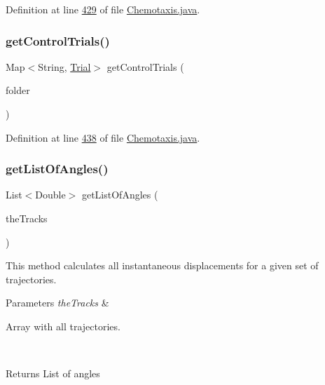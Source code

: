 Definition at line \hyperlink{_chemotaxis_8java_source_l00429}{429} of file \hyperlink{_chemotaxis_8java_source}{Chemotaxis.\+java}.

\hypertarget{classanalysis_1_1_chemotaxis_a00ea60f92f2e11a363c01d04b6df7f10}{}\label{classanalysis_1_1_chemotaxis_a00ea60f92f2e11a363c01d04b6df7f10} 
\subsubsection{\texorpdfstring{get\+Control\+Trials()}{getControlTrials()}}
{\footnotesize\ttfamily Map$<$String, \hyperlink{classdata_1_1_trial}{Trial}$>$ get\+Control\+Trials (\begin{DoxyParamCaption}\item[{String}]{folder }\end{DoxyParamCaption})\hspace{0.3cm}{\ttfamily [private]}}



Definition at line \hyperlink{_chemotaxis_8java_source_l00438}{438} of file \hyperlink{_chemotaxis_8java_source}{Chemotaxis.\+java}.

\hypertarget{classanalysis_1_1_chemotaxis_a0a5886ad5b1d3a1dee18ed4fe5da7ed8}{}\label{classanalysis_1_1_chemotaxis_a0a5886ad5b1d3a1dee18ed4fe5da7ed8} 
\subsubsection{\texorpdfstring{get\+List\+Of\+Angles()}{getListOfAngles()}}
{\footnotesize\ttfamily List$<$Double$>$ get\+List\+Of\+Angles (\begin{DoxyParamCaption}\item[{\hyperlink{classdata_1_1_serializable_list}{Serializable\+List}}]{the\+Tracks }\end{DoxyParamCaption})\hspace{0.3cm}{\ttfamily [private]}}

This method calculates all instantaneous displacements for a given set of trajectories.


\begin{DoxyParams}{Parameters}
{\em the\+Tracks} & 
\begin{DoxyItemize}
\item Array with all trajectories. 
\end{DoxyItemize}\\
\hline
\end{DoxyParams}
\begin{DoxyReturn}{Returns}
List of angles 
\end{DoxyReturn}


